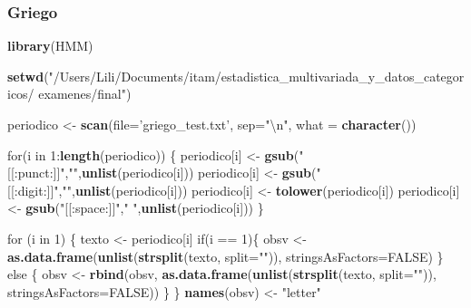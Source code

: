 \documentclass[]{article}
\newenvironment{Shaded}{\begin{snugshade}}{\end{snugshade}}
\newcommand{\KeywordTok}[1]{\textcolor[rgb]{0.13,0.29,0.53}{\textbf{{#1}}}}
\newcommand{\DataTypeTok}[1]{\textcolor[rgb]{0.13,0.29,0.53}{{#1}}}
\newcommand{\DecValTok}[1]{\textcolor[rgb]{0.00,0.00,0.81}{{#1}}}
\newcommand{\CharTok}[1]{\textcolor[rgb]{0.31,0.60,0.02}{{#1}}}
\newcommand{\StringTok}[1]{\textcolor[rgb]{0.31,0.60,0.02}{{#1}}}
\newcommand{\OtherTok}[1]{\textcolor[rgb]{0.56,0.35,0.01}{{#1}}}
\newcommand{\NormalTok}[1]{{#1}}
\begin{document}
\subsubsection{Griego}\label{griego}

\begin{Shaded}
\begin{Highlighting}[]
\KeywordTok{library}\NormalTok{(HMM)}

\KeywordTok{setwd}\NormalTok{(}\StringTok{"/Users/Lili/Documents/itam/estadistica_multivariada_y_datos_categoricos/}
\StringTok{      examenes/final"}\NormalTok{)}


\NormalTok{periodico <-}\StringTok{ }\KeywordTok{scan}\NormalTok{(}\DataTypeTok{file=}\StringTok{'griego_test.txt'}\NormalTok{, }\DataTypeTok{sep=}\StringTok{"}\CharTok{\textbackslash{}n}\StringTok{"}\NormalTok{, }\DataTypeTok{what =} \KeywordTok{character}\NormalTok{())}



\NormalTok{for(i in }\DecValTok{1}\NormalTok{:}\KeywordTok{length}\NormalTok{(periodico)) \{}
  \NormalTok{periodico[i] <-}\StringTok{ }\KeywordTok{gsub}\NormalTok{(}\StringTok{"[[:punct:]]"}\NormalTok{,}\StringTok{""}\NormalTok{,}\KeywordTok{unlist}\NormalTok{(periodico[i]))}
  \NormalTok{periodico[i] <-}\StringTok{ }\KeywordTok{gsub}\NormalTok{(}\StringTok{"[[:digit:]]"}\NormalTok{,}\StringTok{""}\NormalTok{,}\KeywordTok{unlist}\NormalTok{(periodico[i]))}
  \NormalTok{periodico[i] <-}\StringTok{ }\KeywordTok{tolower}\NormalTok{(periodico[i])}
  \NormalTok{periodico[i] <-}\StringTok{ }\KeywordTok{gsub}\NormalTok{(}\StringTok{"[[:space:]]"}\NormalTok{,}\StringTok{" "}\NormalTok{,}\KeywordTok{unlist}\NormalTok{(periodico[i]))}
\NormalTok{\}}



\NormalTok{for (i in }\DecValTok{1}\NormalTok{) \{}
  \NormalTok{texto <-}\StringTok{ }\NormalTok{periodico[i]}
  \NormalTok{if(i ==}\StringTok{ }\DecValTok{1}\NormalTok{)\{}
    \NormalTok{obsv <-}\StringTok{ }\KeywordTok{as.data.frame}\NormalTok{(}\KeywordTok{unlist}\NormalTok{(}\KeywordTok{strsplit}\NormalTok{(texto, }\DataTypeTok{split=}\StringTok{""}\NormalTok{)), }
                          \DataTypeTok{stringsAsFactors=}\OtherTok{FALSE}\NormalTok{)}
  \NormalTok{\} else \{}
    \NormalTok{obsv <-}\StringTok{ }\KeywordTok{rbind}\NormalTok{(obsv, }\KeywordTok{as.data.frame}\NormalTok{(}\KeywordTok{unlist}\NormalTok{(}\KeywordTok{strsplit}\NormalTok{(texto, }\DataTypeTok{split=}\StringTok{""}\NormalTok{)), }
                                      \DataTypeTok{stringsAsFactors=}\OtherTok{FALSE}\NormalTok{))}
  \NormalTok{\}}
\NormalTok{\}}
\KeywordTok{names}\NormalTok{(obsv) <-}\StringTok{ "letter"}


\end{Highlighting}
\end{Shaded}
\end{document}
